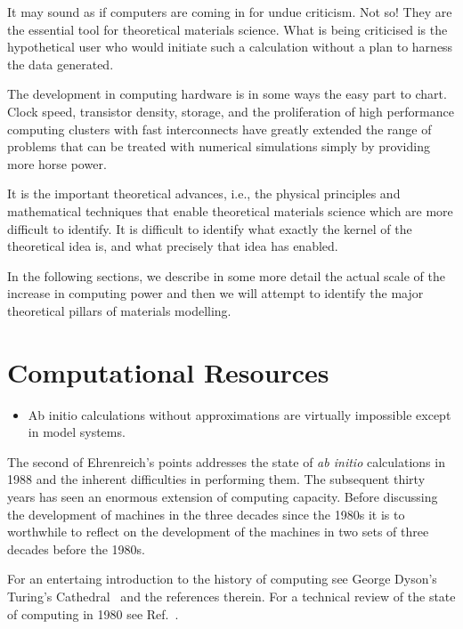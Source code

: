 It may sound as if computers are coming in for undue criticism. Not so! They
are the essential tool for theoretical materials science. What is being criticised
is the hypothetical user who would initiate such a calculation without a
plan to harness the data generated.

The development in computing hardware is in some ways the easy part to chart. 
Clock speed, transistor density, storage, and the proliferation of high 
performance computing clusters with fast interconnects have greatly extended 
the range of problems that can be treated with numerical simulations
simply by providing more horse power.
 

It is the important theoretical advances, i.e., the physical principles and
mathematical techniques that enable theoretical materials science 
which are more difficult to identify. It is difficult to identify what exactly 
the kernel of the theoretical idea is, and what precisely that idea has enabled. 

In the following sections, we describe in some more detail the 
actual scale of the increase in computing power and then we will
attempt to identify the major theoretical pillars of 
materials modelling.

\section{Computational Resources}
\label{sec:riseofcomp}
\begin{itemize}
\item Ab initio calculations without approximations are virtually impossible 
      except in model systems.
\end{itemize}

The second of Ehrenreich's points addresses the state of
{\it ab initio} calculations in 1988 and the inherent 
difficulties in performing them.
The subsequent thirty years has seen an enormous extension of computing capacity. 
Before discussing the development of machines in the three decades since the 1980s it
is to worthwhile to reflect on the development of the machines in two
sets of three decades before the 1980s. 

For an entertaing introduction to the history of computing see 
George Dyson's Turing's Cathedral~\cite{dyson12} 
and the references therein. For a technical review of 
the state of computing in 1980 see Ref.~\cite{metropolis80}.

